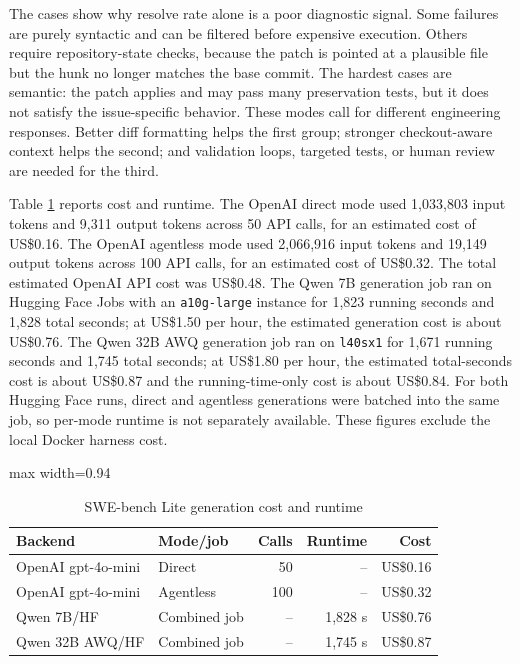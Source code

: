 \documentclass[preprint,12pt]{elsarticle}
\begin{document}
The cases show why resolve rate alone is a poor diagnostic signal. Some failures are purely syntactic and can be filtered before expensive execution. Others require repository-state checks, because the patch is pointed at a plausible file but the hunk no longer matches the base commit. The hardest cases are semantic: the patch applies and may pass many preservation tests, but it does not satisfy the issue-specific behavior. These modes call for different engineering responses. Better diff formatting helps the first group; stronger checkout-aware context helps the second; and validation loops, targeted tests, or human review are needed for the third.

Table \ref{tab:swebench_cost} reports cost and runtime. The OpenAI direct mode used 1,033,803 input tokens and 9,311 output tokens across 50 API calls, for an estimated cost of US\$0.16. The OpenAI agentless mode used 2,066,916 input tokens and 19,149 output tokens across 100 API calls, for an estimated cost of US\$0.32. The total estimated OpenAI API cost was US\$0.48. The Qwen 7B generation job ran on Hugging Face Jobs with an \texttt{a10g-large} instance for 1,823 running seconds and 1,828 total seconds; at US\$1.50 per hour, the estimated generation cost is about US\$0.76. The Qwen 32B AWQ generation job ran on \texttt{l40sx1} for 1,671 running seconds and 1,745 total seconds; at US\$1.80 per hour, the estimated total-seconds cost is about US\$0.87 and the running-time-only cost is about US\$0.84. For both Hugging Face runs, direct and agentless generations were batched into the same job, so per-mode runtime is not separately available. These figures exclude the local Docker harness cost.

\begin{table}[htbp]
\centering
\caption{SWE-bench Lite generation cost and runtime}
\label{tab:swebench_cost}
\begin{adjustbox}{max width=0.94\linewidth}
\begin{tabular}{llrrr}
\toprule
Backend & Mode/job & Calls & Runtime & Cost \\
\midrule
OpenAI gpt-4o-mini & Direct & 50 & -- & US\$0.16 \\
OpenAI gpt-4o-mini & Agentless & 100 & -- & US\$0.32 \\
Qwen 7B/HF & Combined job & -- & 1,828 s & US\$0.76 \\
Qwen 32B AWQ/HF & Combined job & -- & 1,745 s & US\$0.87 \\
\bottomrule
\end{tabular}
\end{adjustbox}
\end{table}
\end{document}
